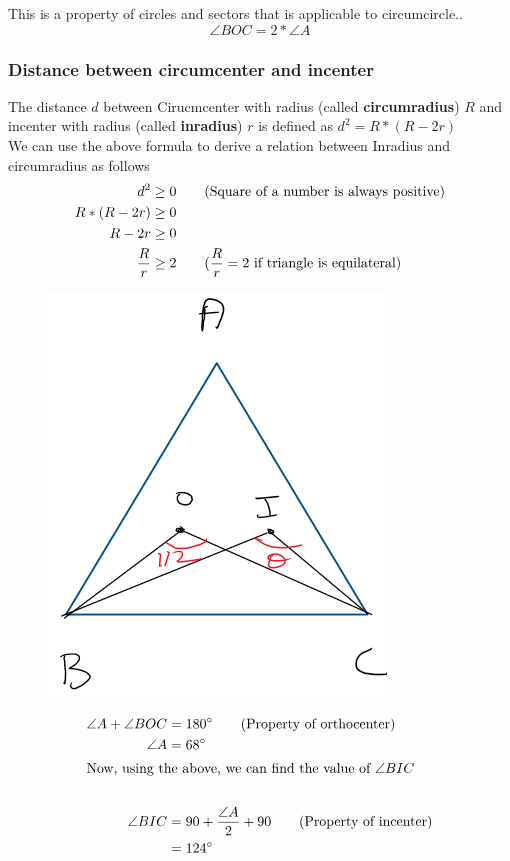 This is a property of circles and sectors that is applicable to circumcircle..
$$
\angle BOC = 2 * \angle A
$$

\subsubsection{Distance between circumcenter and incenter}
The distance $d$ between Cirucmcenter with radius (called \textbf{circumradius}) $R$ and incenter with radius (called \textbf{inradius}) $r$ is defined as $d^2 = R * (R - 2r)$ \\

We can use the above formula to derive a relation between Inradius and circumradius as follows
\begin{align*}
    d^2 &\geq 0 \tag{Square of a number is always positive} \\
    R * (R - 2r) &\geq 0 \\
    R - 2r &\geq 0 \\
    \dfrac{R}{r} &\geq 2 \tag{$\dfrac{R}{r} = 2$ if triangle is equilateral}
\end{align*}


\begin{figure}[h!]
    \centering
    \includegraphics[width=0.3\linewidth]{Quant//Geometry//Images//Triangles/geo_center_question_1.png}
\end{figure}

\begin{align*}
    \angle A + \angle BOC &= {180}^{\circ} \tag{Property of orthocenter} \\
    \angle A &= {68}^{\circ} \\
    \shortintertext{Now, using the above, we can find the value of $\angle BIC$} \\
    \angle BIC &= 90 + \dfrac{\angle A}{2} + 90 \tag{Property of incenter} \\
    &= {124}^{\circ}
\end{align*}








